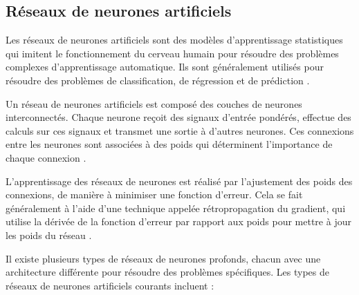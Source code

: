 \subsection{Réseaux de neurones artificiels}
Les réseaux de neurones artificiels sont des modèles d'apprentissage statistiques qui imitent le fonctionnement du cerveau humain pour résoudre des problèmes complexes d'apprentissage automatique. Ils sont généralement utilisés pour résoudre des problèmes de classification, de régression et de prédiction \cite{ch_Deep_Learning}.

Un réseau de neurones artificiels est composé des couches de neurones interconnectés. Chaque neurone reçoit des signaux d'entrée pondérés, effectue des calculs sur ces signaux et transmet une sortie à d'autres neurones. Ces connexions entre les neurones sont associées à des poids qui déterminent l'importance de chaque connexion \cite{ch_Deep_Learning}.

L'apprentissage des réseaux de neurones est réalisé par l'ajustement des poids des connexions, de manière à minimiser une fonction d'erreur. Cela se fait généralement à l'aide d'une technique appelée rétropropagation du gradient, qui utilise la dérivée de la fonction d'erreur par rapport aux poids pour mettre à jour les poids du réseau \cite{ch_Deep_Learning}.

Il existe plusieurs types de réseaux de neurones profonds, chacun avec une architecture différente pour résoudre des problèmes spécifiques. Les types de réseaux de neurones artificiels courants incluent :

